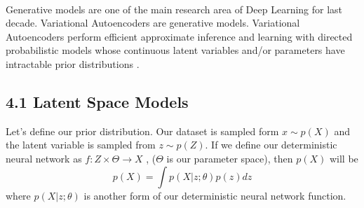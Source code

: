 \documentclass[11pt,twocolumn]{article}
\begin{document}
\\
\hspace*{0.5cm} Generative models are one of the main research area of Deep Learning for last decade. Variational Autoencoders are generative models. Variational Autoencoders perform efficient approximate inference and learning with directed probabilistic models whose continuous latent variables and/or parameters have intractable prior distributions \cite{kingma2014autoencoding}. 
\subsection{4.1 Latent Space Models}
\hspace*{0.5cm} Let's define our prior distribution. Our dataset is sampled form $x \sim p(X)$ and the latent variable is sampled from $z \sim p(Z)$. If we define our deterministic neural network as $f: Z \times \Theta \rightarrow X$ \cite{doersch2016tutorial}, ($\Theta$ is our parameter space), then $p(X)$ will be
\begin{equation} 
p(X) = \int p(X|z;\theta)p(z)dz
\end{equation} 
where $p(X|z;\theta)$ is another form of our deterministic neural network function.
\end{document}
